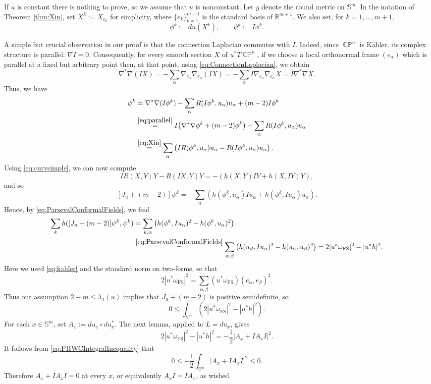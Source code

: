\documentclass[11pt]{article}
\theoremstyle{plain}
\numberwithin{equation}{section}
\theoremstyle{definition}
\let\oldendproof\endproof
\renewenvironment{proof}[1][\proofname]{%
\oldproof[\upshape \bfseries #1]%
}{\oldendproof}
\def \a{\alpha}
\def \R {\mathbb{R}}
\def \mb{\mathbb}
\def \FS{\mathrm{FS}}
\DeclareMathOperator{\CP}{\mathbb{CP}}
\begin{document}
\begin{proof}
If $u$ is constant there is nothing to prove, so we assume that $u$ is
nonconstant.
Let $g$ denote the round metric on $\mb S^m$.  
In the notation of Theorem \ref{thm:Xin}, set $X^k := X_{e_k}$ for simplicity, where $\{e_k\}_{k=1}^{m+1}$ is the standard basis of $\R^{m+1}$.  We also set, for $k=1, \dots, m+1,$
$$
\phi^k:=du(X^k),\qquad
\psi^k:=I \phi^k.
$$

A simple but crucial observation in our proof is that the connection Laplacian commutes with $I$.  Indeed, since
$\CP^n$ is K\"ahler, its complex structure is parallel: $\nabla I=0$.
Consequently, for every smooth
section $X$ of $u^*T\CP^n$, if we choose a local orthonormal frame
$(e_\alpha)$ which is parallel at a fixed but arbitrary point then, at that point,  using
\eqref{eq:ConnectionLaplacian}, we obtain
\begin{equation}
\label{eq:parallel}
\nabla^*\nabla(IX)
=-\sum_\alpha\nabla_{e_\alpha}\nabla_{e_\alpha}(IX)
=-\sum_\alpha I\nabla_{e_\alpha}\nabla_{e_\alpha}X
=I\nabla^*\nabla X.
\end{equation}
Thus, we have
\begin{align*}
[J_u + (m-2)]\psi^k
&= \nabla^* \nabla(I\phi^k)
   - \sum_\a R(I\phi^k,u_\a)u_\a
   + (m-2)I\phi^k\\
&\overset{\eqref{eq:parallel}}{=}
  I\bigl(\nabla^*\nabla\phi^k+(m-2)\phi^k\bigr)
  -\sum_\a R(I\phi^k,u_\a)u_\a\\
&\overset{\eqref{eq:Xin}}{=}
  \sum_\a\left(
  I R(\phi^k,u_\a)u_\a-R(I\phi^k,u_\a)u_\a
  \right).
\end{align*}
Using \eqref{eq:curvsimple}, we can now compute
\[
I R(X,Y)Y-R(IX,Y)Y
=-\left(h(X,Y)IY+h(X,IY)Y\right),
\]
and so
\[
[J_u+(m-2)]\psi^k
=-\sum_\a\left(
h(\phi^k,u_\a)Iu_\a+h(\phi^k,Iu_\a)u_\a
\right).
\]
Hence, by \eqref{eq:ParsevalConformalFields}, we find
\begin{align*}
\sum_k h([J_u+(m-2)]\psi^k,\psi^k)
&=\sum_{k,\a}\left(
h(\phi^k,Iu_\a)^2-h(\phi^k,u_\a)^2
\right)\\
&\overset{\eqref{eq:ParsevalConformalFields}}{=}\sum_{\a,\beta}\left(
h(u_\beta,Iu_\a)^2-h(u_\a,u_\beta)^2
\right)=2|u^*\omega_\FS|^2-|u^*h|^2.
\end{align*}
Here we used \eqref{eq:kahler} and the standard norm on two-forms, so that
\begin{equation}
\label{eq:norm2form}
2|u^*\omega_\FS|^2=\sum_{\a,\beta}
(u^*\omega_\FS)(e_\a,e_\beta)^2.
\end{equation}
Thus our assumption $2-m\leq\lambda_1(u)$ implies that $J_u + (m-2)$ is positive semidefinite, so
\begin{equation}
    \label{eq:PHWCIntegralInequality}
    0\leq
    \int_{\mb S^m}
    \left(2|u^*\omega_\FS|^2-|u^*h|^2\right).
\end{equation}
For each $x\in\mb S^m$, set $A_x:=du_x\circ du_x^*$.  The next lemma,
applied to $L=du_x$, gives
\[
2|u^*\omega_\FS|^2-|u^*h|^2
=-\frac12|A_x+IA_xI|^2.
\]
It follows from \eqref{eq:PHWCIntegralInequality} that
\[
0\leq-\frac12\int_{\mb S^m}|A_x+IA_xI|^2\leq0.
\]
Therefore $A_x+IA_xI=0$ at every $x$, or equivalently
$A_xI=IA_x$, as wished.
\end{proof}
\end{document}
